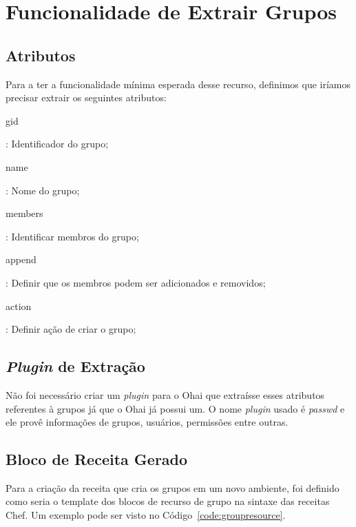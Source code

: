 \section{Funcionalidade de Extrair Grupos}
\label{sec:groups}

\subsection{Atributos}

Para a ter a funcionalidade mínima esperada desse recurso, definimos que iríamos precisar
extrair os seguintes atributos:

\begin{itemize}
    {\itshape\item gid}: Identificador do grupo;
    {\itshape\item name}: Nome do grupo;
    {\itshape\item members}: Identificar membros do grupo;
\end{itemize}


\begin{itemize}
    {\itshape\item append}: Definir que os membros podem ser adicionados e removidos;
    {\itshape\item action}: Definir ação de criar o grupo;
\end{itemize}

\subsection{\textit{Plugin} de Extração}
Não foi necessário criar um \textit{plugin} para o Ohai que extraísse esses atributos
referentes à grupos já que o Ohai já possui um. O nome \textit{plugin} usado é 
\textit{passwd} e ele provê informações de grupos, usuários, permissões entre outras.

\subsection{Bloco de Receita Gerado}

Para a criação da receita que cria os grupos em um novo ambiente, foi definido
como seria o template dos blocos de recurso de grupo na sintaxe das receitas Chef.
Um exemplo pode ser visto no Código~\ref{code:groupresource}.

\noindent\begin{minipage}{\textwidth}
  \lstset{style=shell}
  
\end{minipage}\hfill

